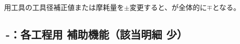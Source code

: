 \begin{marker}
\DimpleMilling 用工具の工具径補正値または摩耗量を$\pm$変更すると、\DimpleDepth が全体的に$\mp$となる。
\end{marker}


\clearpage
\subsection{\,-：各工程用 補助機能（該当明細 少）}

